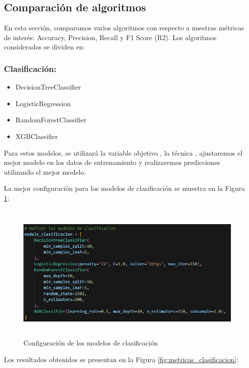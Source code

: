 \subsection{Comparación de algoritmos}

En esta sección, comparamos varios algoritmos con respecto a nuestras métricas de interés: Accuracy, Precision, Recall y F1 Score (R2). Los algoritmos considerados se dividen en:

\subsubsection*{Clasificación:}

\begin{itemize}
    \item DecisionTreeClassifier
    \item LogisticRegression
    \item RandomForestClassifier
    \item XGBClassifier
\end{itemize}

Para estos modelos, se utilizará la variable objetivo , la técnica , ajustaremos el mejor modelo en los datos de entrenamiento y realizaremos predicciones utilizando el mejor modelo.

La mejor configuración para los modelos de clasificación se muestra en la Figura \ref{fig:config_clasifiacion}:

\begin{figure}[H]
    \centering
    \includegraphics[width=6.0611in,height=2.6861in]{img/compara_algoritmos/configModelsClasificacion.png}
    \caption{Configuración de los modelos de clasificación}
    \label{fig:config_clasifiacion}
\end{figure}

Los resultados obtenidos se presentan en la Figura \ref{fig:metricas_clasificacion}:

